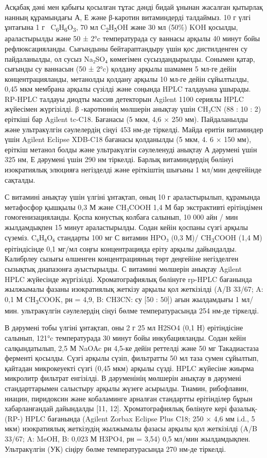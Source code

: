 \begin{multicols}{2}
Асқабақ дәні мен қабығы қосылған тұтас дәнді бидай ұнынан жасалған
қытырлақ нанның құрамындағы А, Е және β-каротин витаминдерді талдаймыз.
10 г үлгі ұнтағына 1 г
~C\textsubscript{6}H\textsubscript{6}O\textsubscript{3}, 70 мл
C\textsubscript{2}H\textsubscript{5}OH және 30 мл (50\%) KOH қосылды,
араластырылды және 50 ± 2°c температурада су ваннасы арқылы 40 минут
бойы рефлюксацияланды. Сығындыны бейтараптандыру үшін қос дистилденген
су пайдаланылды, ол сусыз Na₂SO₄ көмегімен сусыздандырылды. Сонымен
қатар, сығынды су ваннасын (50 ± 2°c) қолдану арқылы шамамен 5 мл-ге
дейін концентрацияланды, метанолды қолдану арқылы 10 мл-ге дейін
сұйылтылды, 0,45 мкм мембрана арқылы сүзілді және соңында HPLC талдауына
ұшырады. RP-HPLC талдауы диодты массив детекторын Agilent 1100 сериялы
HPLC жүйесімен жүргізілді. β -каротиннің мөлшерін анықтау үшін CH₃CN (88
: 10 : 2) еріткіші бар Agilent tc-C18. Бағанасы (5 мкм, 4,6 × 250 мм).
Пайдаланылды және ультракүлгін сәулелердің сіңуі 453 нм-де тіркелді.
Майда еритін витаминдер үшін Agilent Eclipse XDB-C18 бағанасы қолданылды
(5 мкм, 4. 6 × 150 мм), еріткіш метанол болды және ультракүлгін
сәулеленуді анықтау А дәрумені үшін 325 нм, Е дәрумені үшін 290 нм
тіркелді. Барлық витаминдердің бөлінуі изократиялық элюцияға негізделді
және еріткіштің шығыны 1 мл/мин деңгейінде сақталды.

С витамині анықтау үшін үлгіні ұнтақтап, оның 10 г араластырылып,
құрамында метафосфор қышқылы 0,3 М және CH₃COOH 1,4 М бар экстрактивті
ерітіндімен гомогенизацияланды. Қоспа конустық колбаға салынып, 10 000
айн / мин жылдамдықпен 15 минут араластырылды. Содан кейін қоспаны сүзгі
арқылы сүземіз. C₆H₈O₆ стандарты 100 мг С витамин HPO₃ (0,3 М)/
CH\textsubscript{3}COOH (1,4 М) ерітіндісінде 0,1 мг/мл соңғы
концентрацияда еріту арқылы дайындалды. Калибрлеу сызығы өлшенген
концентрацияның төрт деңгейіне негізделген сызықтық диапазонға
ауыстырылды. С витамині мөлшерін анықтау Agilent HPLC жүйесінде
жүргізілді. Хроматографиялық бөлінуге rp-HPLC бағанында жылжымалы фазаны
изократиялық жеткізу арқылы қол жеткізілді (A/B 33/67; A: 0,1 М
CH\textsubscript{3}COOK, рн = 4,9, B: CH3CN: су {[}50 : 50{]}) ағын
жылдамдығы 1 мл/мин. ультракүлгін сәулелердің сіңуі бөлме
температурасында 254 нм-де тіркелді.

В дәрумені тобы үлгіні ұнтақтап, оны 2 г 25 мл H2SO4 (0,1 Н)
ерітіндісіне салынып, 121°c температурада 30 минут бойы инкубацияланды.
Содан кейін салқындатылып, 2,5 М NaOAc рн 4,5-ке дейін реттелді және 50
мг Такадиастаза ферменті қосылды. Сүзгі арқылы сүзіп, фильтратты 50 мл
таза сумен сұйылтып, қайтадан микрокеуекті сүзгі (0,45 мкм) арқылы
сүзді. HPLC жүйесіне жиырма микролитр фильтрат енгізілді. В дәруменінің
мөлшерін анықтау в дәрумені стандарттарымен салыстыру арқылы жүзеге
асырылды. Тиамин, рибофлавин, ниацин, пиридоксин және кобаламинге
арналған стандартты ерітінділер бұрын хабарланғандай дайындалды {[}11,
12{]}. Хроматографиялық бөлінуге кері фазалық- (RP-) HPLC бағанында
(Agilent Zorbax Eclipse Plus C18; 250 × 4,6 мм i.d., 5 мкм) изократиялық
жеткізудің жылжымалы фазасы арқылы қол жеткізілді (A/B 33/67; A: MeOH,
B: 0,023 М H3PO4, рн = 3,54) 0,5 мл/мин жылдамдықпен. Ультракүлгін (УК)
сіңіру бөлме температурасында 270 нм-де тіркелді.


\end{multicols}
